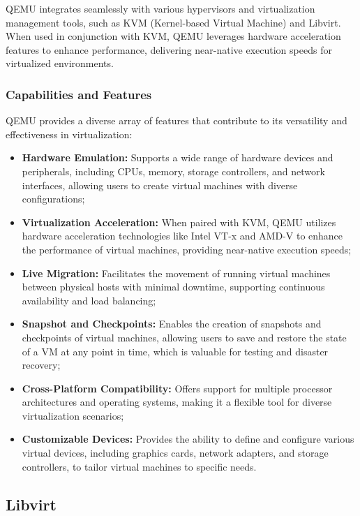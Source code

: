 QEMU integrates seamlessly with various hypervisors and virtualization management tools, such as KVM (Kernel-based Virtual Machine) and Libvirt. When used in conjunction with KVM, QEMU leverages hardware acceleration features to enhance performance, delivering near-native execution speeds for virtualized environments.


\subsubsection[Capabilities and Features]{Capabilities and Features}
QEMU provides a diverse array of features that contribute to its versatility and effectiveness in virtualization:
\begin{itemize}
\item \textbf{Hardware Emulation:} Supports a wide range of hardware devices and peripherals, including CPUs, memory, storage controllers, and network interfaces, allowing users to create virtual machines with diverse configurations;
\item \textbf{Virtualization Acceleration:} When paired with KVM, QEMU utilizes hardware acceleration technologies like Intel VT-x and AMD-V to enhance the performance of virtual machines, providing near-native execution speeds;
\item \textbf{Live Migration:} Facilitates the movement of running virtual machines between physical hosts with minimal downtime, supporting continuous availability and load balancing;
\item \textbf{Snapshot and Checkpoints:} Enables the creation of snapshots and checkpoints of virtual machines, allowing users to save and restore the state of a VM at any point in time, which is valuable for testing and disaster recovery;
\item \textbf{Cross-Platform Compatibility:} Offers support for multiple processor architectures and operating systems, making it a flexible tool for diverse virtualization scenarios;
\item \textbf{Customizable Devices:} Provides the ability to define and configure various virtual devices, including graphics cards, network adapters, and storage controllers, to tailor virtual machines to specific needs.
\end{itemize}

\subsection{Libvirt}

